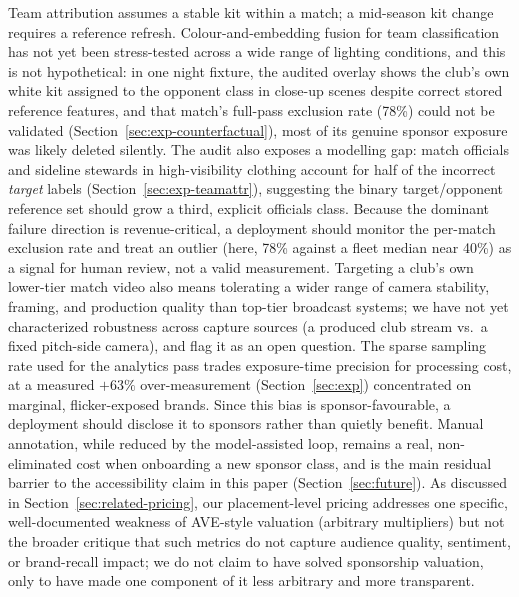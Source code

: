 \documentclass[conference,a4paper]{IEEEtran}
\begin{document}
Team attribution assumes a stable kit within a match; a mid-season kit change requires a
reference refresh. Colour-and-embedding fusion for team classification has not yet been
stress-tested across a wide range of lighting conditions, and this is not hypothetical:
in one night fixture, the audited overlay shows the club's own white kit assigned to
the opponent class in close-up scenes despite correct stored reference features, and
that match's full-pass exclusion rate (78\%) could not be validated
(Section~\ref{sec:exp-counterfactual}), most of its genuine sponsor exposure was likely
deleted silently. The audit also exposes a modelling gap: match officials and
sideline stewards in high-visibility clothing account for half of the incorrect
\emph{target} labels (Section~\ref{sec:exp-teamattr}), suggesting the binary
target/opponent reference set should grow a third, explicit officials class. Because
the dominant failure direction is revenue-critical, a
deployment should monitor the per-match exclusion rate and treat an outlier (here,
78\% against a fleet median near 40\%) as a signal for human review, not a
valid measurement. Targeting a club's own lower-tier match video also means tolerating a
wider range of camera stability, framing, and production quality than top-tier broadcast
systems; we have not yet characterized robustness across capture sources (a produced club
stream vs.\ a fixed pitch-side camera), and flag it as an open question. The sparse sampling rate used
for the analytics pass trades exposure-time precision for processing cost, at a measured
$+63\%$ over-measurement (Section~\ref{sec:exp}) concentrated on marginal,
flicker-exposed brands. Since this bias is sponsor-favourable, a deployment should
disclose it to sponsors rather than quietly benefit.
Manual annotation, while reduced by the model-assisted loop, remains a real,
non-eliminated cost when onboarding a new sponsor class, and is the main residual
barrier to the accessibility claim in this paper (Section~\ref{sec:future}). As discussed in
Section~\ref{sec:related-pricing}, our placement-level pricing addresses one specific,
well-documented weakness of AVE-style valuation (arbitrary multipliers) but not the
broader critique that such metrics do not capture audience quality, sentiment, or
brand-recall impact; we do not claim to have solved sponsorship valuation, only to have
made one component of it less arbitrary and more transparent.
\end{document}
